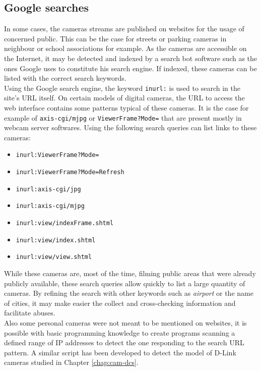 \subsection{Google searches}
\label{sec:cam-google}

In some cases, the cameras streams are published on websites for the usage of concerned public.
This can be the case for streets or parking cameras in neighbour or school associations for example.
As the cameras are accessible on the Internet, it may be detected and indexed by a search bot software such as the ones Google uses to constitute his search engine.
If indexed, these cameras can be listed with the correct search keywords.\\

Using the Google search engine, the keyword \texttt{inurl:} is used to search in the site's URL itself.
On certain models of digital cameras, the URL to access the web interface contains some patterns typical of these cameras.
It is the case for example of \texttt{axis-cgi/mjpg} or \texttt{ViewerFrame?Mode=} that are present mostly in webcam server softwares.
Using the following search queries can list links to these cameras:

\begin{itemize}
\item \texttt{inurl:ViewerFrame?Mode=}
\item \texttt{inurl:ViewerFrame?Mode=Refresh}
\item \texttt{inurl:axis-cgi/jpg}
\item \texttt{inurl:axis-cgi/mjpg}
\item \texttt{inurl:view/indexFrame.shtml}
\item \texttt{inurl:view/index.shtml}
\item \texttt{inurl:view/view.shtml}
\end{itemize}

While these cameras are, most of the time, filming public areas that were already publicly available, these search queries allow quickly to list a large quantity of cameras.
By refining the search with other keywords such as \emph{airport} or the name of cities, it may make easier the collect and cross-checking information and facilitate abuses.\\

Also some personal cameras were not meant to be mentioned on websites, it is possible with basic programming knowledge to create programs scanning a defined range of IP addresses to detect the one responding to the search URL pattern.
A similar script has been developed to detect the model of D-Link cameras studied in Chapter \ref{chap:cam-dcs}.\\


